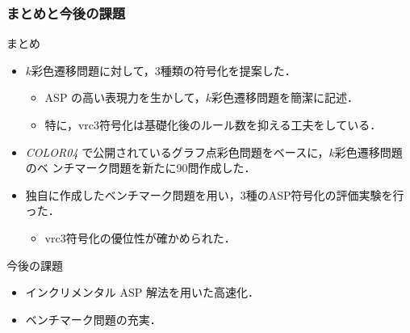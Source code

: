 \documentclass[dvipdfmx,11pt]{beamer}
\begin{document}
\begin{frame}\frametitle{まとめと今後の課題}

  \begin{block}{まとめ}
    \begin{itemize}
      \item $k$彩色遷移問題に対して，3種類の符号化を提案した．
      \begin{itemize}
      \item ASP の高い表現力を生かして，$k$彩色遷移問題を簡潔に記述．
      \item 特に，vrc3符号化は基礎化後のルール数を抑える工夫をしている．
      \end{itemize}
    \item \textit{COLOR04}
      で公開されているグラフ点彩色問題をベースに，$k$彩色遷移問題のベ
      ンチマーク問題を新たに90問作成した．
    \item 独自に作成したベンチマーク問題を用い，3種のASP符号化の評価実験を行った．
      \begin{itemize}
      \item vrc3符号化の優位性が確かめられた．
      \end{itemize}
    \end{itemize}
  \end{block}
  
  \begin{alertblock}{今後の課題}
    \begin{itemize}
      \item インクリメンタル ASP 解法を用いた高速化．
      \item ベンチマーク問題の充実．
    \end{itemize}
  \end{alertblock}

\end{frame}



\end{document}
